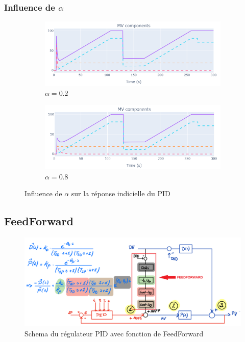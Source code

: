 \subsubsection{Influence de \texorpdfstring{$\alpha$}{alpha}}
\begin{figure}[H]
    \centering
    \begin{subfigure}[b]{0.48\textwidth}
        \includegraphics[width=\textwidth]{../Plots/PID/PID_Response_low_alpha.png}
        \caption{$\alpha = 0.2$}
    \end{subfigure}
    \begin{subfigure}[b]{0.48\textwidth}
        \includegraphics[width=\textwidth]{../Plots/PID/PID_Response_high_alpha.png}
        \caption{$\alpha = 0.8$}
    \end{subfigure}
    \caption{Influence de $\alpha$ sur la réponse indicielle du PID}
    \label{fig:Alpha_Influence_PID}
\end{figure}

\subsection{FeedForward}

\begin{figure}[h]
    \centering
    \includegraphics[width=\textwidth]{figures/schemaFF.png}
    \caption{Schema du régulateur PID avec fonction de FeedForward}
	\label{fig:schemaFF}
\end{figure}

